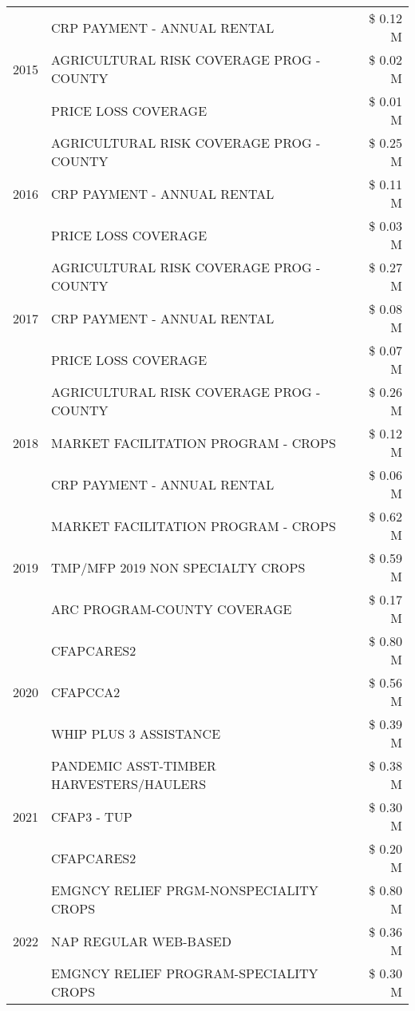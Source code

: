 \begin{tabular}{llr}
\cline{1-3}
\multirow[t]{3}{*}{2015} & CRP PAYMENT - ANNUAL RENTAL & \$ 0.12 M \\
 & AGRICULTURAL RISK COVERAGE PROG - COUNTY & \$ 0.02 M \\
 & PRICE LOSS COVERAGE & \$ 0.01 M \\
\cline{1-3}
\multirow[t]{3}{*}{2016} & AGRICULTURAL RISK COVERAGE PROG - COUNTY & \$ 0.25 M \\
 & CRP PAYMENT - ANNUAL RENTAL & \$ 0.11 M \\
 & PRICE LOSS COVERAGE & \$ 0.03 M \\
\cline{1-3}
\multirow[t]{3}{*}{2017} & AGRICULTURAL RISK COVERAGE PROG - COUNTY & \$ 0.27 M \\
 & CRP PAYMENT - ANNUAL RENTAL & \$ 0.08 M \\
 & PRICE LOSS COVERAGE & \$ 0.07 M \\
\cline{1-3}
\multirow[t]{3}{*}{2018} & AGRICULTURAL RISK COVERAGE PROG - COUNTY & \$ 0.26 M \\
 & MARKET FACILITATION PROGRAM - CROPS & \$ 0.12 M \\
 & CRP PAYMENT - ANNUAL RENTAL & \$ 0.06 M \\
\cline{1-3}
\multirow[t]{3}{*}{2019} & MARKET FACILITATION PROGRAM - CROPS & \$ 0.62 M \\
 & TMP/MFP 2019 NON SPECIALTY CROPS & \$ 0.59 M \\
 & ARC PROGRAM-COUNTY COVERAGE & \$ 0.17 M \\
\cline{1-3}
\multirow[t]{3}{*}{2020} & CFAPCARES2 & \$ 0.80 M \\
 & CFAPCCA2 & \$ 0.56 M \\
 & WHIP PLUS 3 ASSISTANCE & \$ 0.39 M \\
\cline{1-3}
\multirow[t]{3}{*}{2021} & PANDEMIC ASST-TIMBER HARVESTERS/HAULERS & \$ 0.38 M \\
 & CFAP3 - TUP & \$ 0.30 M \\
 & CFAPCARES2 & \$ 0.20 M \\
\cline{1-3}
\multirow[t]{3}{*}{2022} & EMGNCY RELIEF PRGM-NONSPECIALITY CROPS & \$ 0.80 M \\
 & NAP REGULAR WEB-BASED & \$ 0.36 M \\
 & EMGNCY RELIEF PROGRAM-SPECIALITY CROPS & \$ 0.30 M \\
\cline{1-3}
\bottomrule
\end{tabular}
